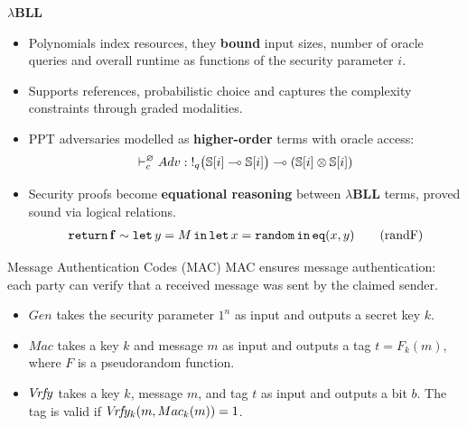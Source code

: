 \documentclass{beamer}[aspectratio=169]
\newcommand{\lamBLL}{{\lambda}\mathbf{BLL}}
\begin{document}
\begin{frame}{$\lamBLL$}
\begin{itemize}
    \item Polynomials index resources, they \textbf{bound} input sizes, number of oracle queries and overall runtime as functions of the security parameter $i$.
    \item Supports references, probabilistic choice and captures the complexity constraints through graded modalities.
    \item PPT adversaries modelled as \textbf{higher-order} terms with oracle access:
    \[
    \vdash_c^\varnothing Adv: \mathord{!}_{q}\bigl(\mathbb{S}[i] \multimap \mathbb{S}[i]\bigr) \multimap (\mathbb{S}[i] \otimes \mathbb{S}[i])
    \]
    \item Security proofs become \textbf{equational reasoning} between $\lamBLL$ terms, proved sound via logical relations.
    \small
    \begin{align}
	\mathtt{return}\,{} \mathbf{f} \sim \mathtt{let}\,y = M\,\mathtt{in}\, \mathtt{let}\,x= \mathtt{random}\,\mathtt{in}\, \mathtt{eq}(x,y) \label{randF} \tag{randF}
    \end{align}
\end{itemize}
\end{frame}

\begin{frame}{Message Authentication Codes (MAC)}
MAC ensures message authentication: each party can verify that a received message was sent by the claimed sender.
\begin{construction}\label{construction:prf-mac}
    \begin{itemize}
        \item $Gen$ takes the security parameter $1^n$ as input and outputs a secret key $k$.
        \item<2-> $Mac$ takes a key $k$ and message $m$ as input and outputs a tag $t = F_k(m)$, where $F$ is a pseudorandom function.
        \item<3-> $V\!r\!f\!y$ takes a key $k$, message $m$, and tag $t$ as input and outputs a bit $b$. The tag is valid if $V\!r\!f\!y_k(m,Mac_k(m))=1$.
    \end{itemize}
\end{construction}
\end{frame}
\end{document}
